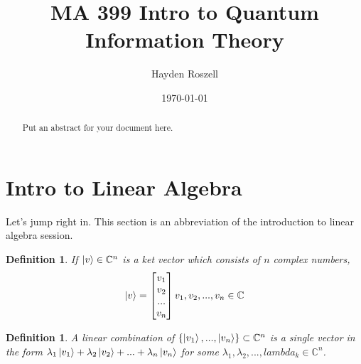 \documentclass[12pt]{article}
\title{MA 399 Intro to Quantum Information Theory}
\author{Hayden Roszell}
\date{\today}
\theoremstyle{plain}
\theoremstyle{nonumberplain}
\theoremstyle{plain}
\newtheorem{definition}[lemma]{Definition}
\theoremstyle{nonumberplain}
\newcommand\1{{\bf 1}}
\newcommand{\bmat}[1]{\begin{bmatrix*} #1 \end{bmatrix*}} %
\newcommand{\C}{\mathbb{C}} %
\newcommand{\<}{\left\langle}
\renewcommand{\>}{\right\rangle}
\begin{document}
\maketitle
\begin{abstract}
Put an abstract for your document here.
\end{abstract}

\tableofcontents

\section{Intro to Linear Algebra}

Let's jump right in. This section is an abbreviation of the introduction to linear algebra session.
\begin{definition}
If $\ket{v}\in\C^n$ is a \textit{ket} vector which consists of $n$ complex numbers,
\begin{equation}
\ket{v}=\bmat{v_1 \\ v_2 \\ ... \\ v_n} v_1, v_2, ..., v_n \in \C
\end{equation}
\end{definition}

\begin{definition}
A linear combination of $\lbrace\ket{v_1}, ..., \ket{v_n}\rbrace\subset\C^n$ is a single vector in the form $\lambda_1\ket{v_1} + \lambda_2\ket{v_2} + ... + \lambda_n\ket{v_n}$ for some $\lambda_1, \lambda_2, ... , lambda_k\in\C^n$.
\end{definition}

\end{document}
